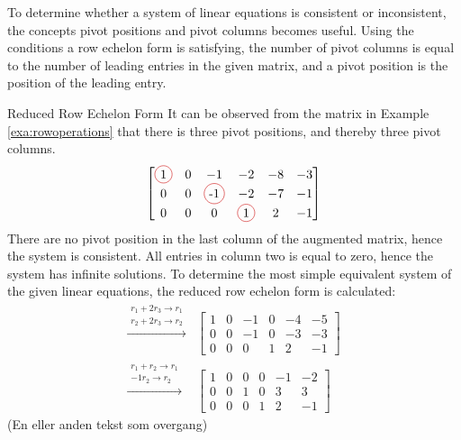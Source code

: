 To determine whether a system of linear equations is consistent or inconsistent, the concepts pivot positions and pivot columns
becomes useful. Using the conditions a row echelon form is satisfying, the number of pivot columns is equal to the number of leading entries in the given matrix, and a pivot position is the position of the leading entry.  
\begin{example}{Reduced Row Echelon Form}
It can be observed from the matrix in Example \ref{exa:rowoperations} that there is three pivot positions, and thereby three pivot columns.
\begin{align*}
     \begin{bmatrix}
  	 \circled{1} & 0 & -1 &-2 & -8 & -3 \\
 	 0 & 0 & \circled{-1} & -2 & -7 & -1 \\
	 0 &0 & 0 & \circled{1} & 2 & -1
       \end{bmatrix}
\end{align*}
There are no pivot position in the last column of the augmented matrix, hence the system is consistent. All entries in column two is equal to zero, hence the system has infinite solutions. To determine the most simple equivalent system of the given linear equations, the reduced row echelon form is calculated:
\begin{align*}
  \xrightarrow{\substack{r_1+2r_3\rightarrow r_1\\r_2+2r_3\rightarrow r_2}}
    &\begin{bmatrix}
  	    1 & 0 & -1 &0 & -4 & -5 \\
 	    0 & 0 & -1 & 0 & -3 & -3 \\
	    0 &0 & 0 & 1 & 2 & -1
     \end{bmatrix}\\
  \xrightarrow{\substack{r_1+r_2\rightarrow r_1\\-1r_2\rightarrow r_2}}
  &\begin{bmatrix}
        1 & 0 & 0 &0 & -1 & -2 \\
 	    0 & 0 & 1 & 0 & 3 & 3 \\
	    0 &0 & 0 & 1 & 2 & -1
     \end{bmatrix}
    \end{align*}
(En eller anden tekst som overgang)


\end{example}

